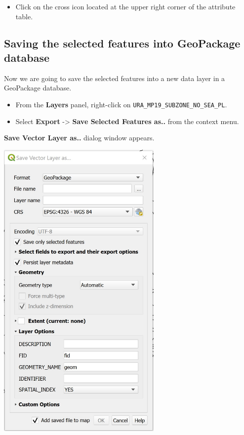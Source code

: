 \documentclass[
  letterpaper,
  DIV=11,
  numbers=noendperiod]{scrreprt}
\providecommand{\tightlist}{%
  \setlength{\itemsep}{0pt}\setlength{\parskip}{0pt}}\usepackage{longtable,booktabs,array}
\begin{document}
\begin{itemize}
\tightlist
\item
  Click on the cross icon located at the upper right corner of the
  attribute table.
\end{itemize}

\hypertarget{saving-the-selected-features-into-geopackage-database}{%
\subsection{Saving the selected features into GeoPackage
database}\label{saving-the-selected-features-into-geopackage-database}}

Now we are going to save the selected features into a new data layer in
a GeoPackage database.

\begin{itemize}
\item
  From the \textbf{Layers} panel, right-click on
  \texttt{URA\_MP19\_SUBZONE\_NO\_SEA\_PL}.
\item
  Select \textbf{Export} -\textgreater{} \textbf{Save Selected Features
  as..} from the context menu.
\end{itemize}

\textbf{Save Vector Layer as..} dialog window appears.

\includegraphics[width=3.15625in,height=\textheight]{./img04/image15.jpg}
\end{document}
